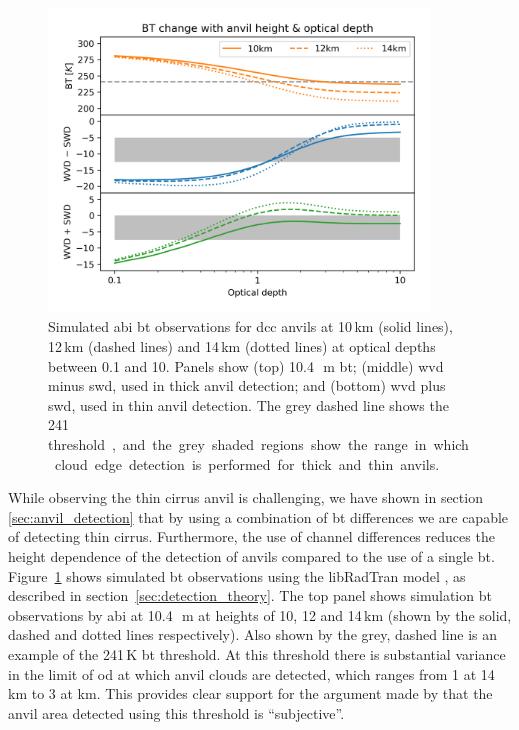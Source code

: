 \begin{figure}[tp]
    \centering
    \includegraphics[width=0.9\textwidth]{figures/chapter3_01.png}
    \caption[
    Simulated \acrshort{abi} \acrshort{bt} observations of \acrshort{dcc} anvils at a range of heights and optical depths for detection of thick and thin anvil detection
    ]{
    Simulated \acrshort{abi} \acrshort{bt} observations for \acrshort{dcc} anvils at 10\,\unit{km} (solid lines), 12\,\unit{km} (dashed lines) and 14\,\unit{km} (dotted lines) at optical depths between 0.1 and 10. Panels show (top) 10.4\,\unit{\mu m} \acrshort{bt}; (middle) \acrshort{wvd} minus \acrshort{swd}, used in thick anvil detection; and (bottom) \acrshort{wvd} plus \acrshort{swd}, used in thin anvil detection. The grey dashed line shows the 241\,\unit[K] threshold, and the grey shaded regions show the range in which cloud edge detection is performed for thick and thin anvils.
    }
    \label{fig:bt_wvd_swd_height_od}
\end{figure}

While observing the thin cirrus anvil is challenging, we have shown in section \ref{sec:anvil_detection} that by using a combination of \acrshort{bt} differences we are capable of detecting thin cirrus.
Furthermore, the use of channel differences reduces the height dependence of the detection of anvils compared to the use of a single \acrshort{bt}.
Figure~\ref{fig:bt_wvd_swd_height_od} shows simulated \acrshort{bt} observations using the libRadTran model \citep{emde_libradtran_2016}, as described in section~\ref{sec:detection_theory}.
The top panel shows simulation \acrshort{bt} observations by \acrshort{abi} at 10.4\,\unit{\mu m} at heights of 10, 12 and 14\,\unit{km} (shown by the solid, dashed and dotted lines respectively).
Also shown by the grey, dashed line is an example of the 241\,\unit{K} \acrshort{bt} threshold.
At this threshold there is substantial variance in the limit of \acrshort{od} at which anvil clouds are detected, which ranges from 1 at 14\,\unit{km} to 3 at \unit{km}.
This provides clear support for the argument made by \citet{augustine_mesoscale_1988} that the anvil area detected using this threshold is ``subjective''.

